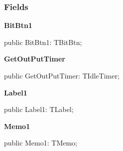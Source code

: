 \documentclass{report}
\newif\ifpdf
\begin{document}
\subsubsection*{\large{\textbf{Fields}}\normalsize\hspace{1ex}\hfill}
\begin{list}{}{
\setlength{\itemindent}{0cm}
\setlength{\listparindent}{0cm}
\setlength{\leftmargin}{\evensidemargin}
\addtolength{\leftmargin}{\tmplength}
\settowidth{\labelsep}{X}
\addtolength{\leftmargin}{\labelsep}
\setlength{\labelwidth}{\tmplength}
}
\label{uninstall.TRMForm-BitBtn1}
\item[\textbf{BitBtn1}\hfill]
\ifpdf
\begin{flushleft}
\fi
\begin{ttfamily}
public BitBtn1: TBitBtn;\end{ttfamily}

\ifpdf
\end{flushleft}
\fi


\par  \label{uninstall.TRMForm-GetOutPutTimer}
\item[\textbf{GetOutPutTimer}\hfill]
\ifpdf
\begin{flushleft}
\fi
\begin{ttfamily}
public GetOutPutTimer: TIdleTimer;\end{ttfamily}

\ifpdf
\end{flushleft}
\fi


\par  \label{uninstall.TRMForm-Label1}
\item[\textbf{Label1}\hfill]
\ifpdf
\begin{flushleft}
\fi
\begin{ttfamily}
public Label1: TLabel;\end{ttfamily}

\ifpdf
\end{flushleft}
\fi


\par  \label{uninstall.TRMForm-Memo1}
\item[\textbf{Memo1}\hfill]
\ifpdf
\begin{flushleft}
\fi
\begin{ttfamily}
public Memo1: TMemo;\end{ttfamily}

\ifpdf
\end{flushleft}
\fi



\end{list}
\end{document}
